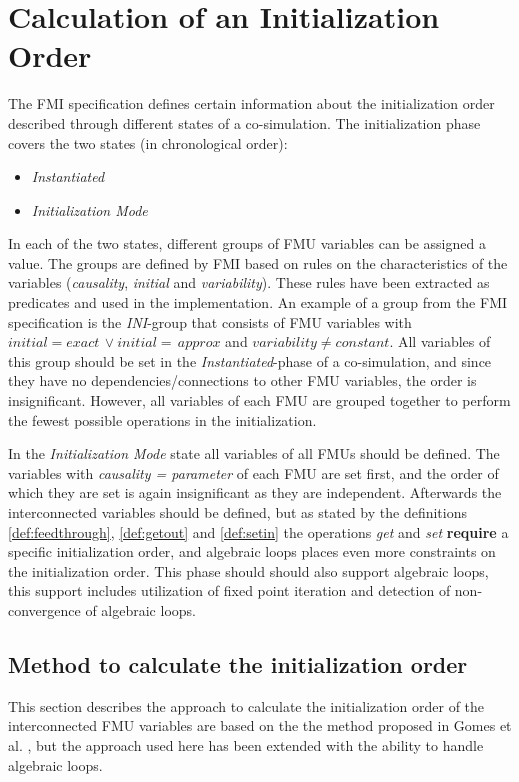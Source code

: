\section{Calculation of an Initialization Order}\label{sc:initilization}
The FMI specification defines certain information about the initialization order described through different states of a co-simulation. The initialization phase covers the two states (in chronological order):
\begin{itemize}
    \item \textit{Instantiated}
    \item \textit{Initialization Mode}
\end{itemize}
In each of the two states, different groups of FMU variables can be assigned a value. The groups are defined by FMI based on rules on the characteristics of the variables (\textit{causality}, \textit{initial} and \textit{variability}). These rules have been extracted as predicates and used in the implementation. 
An example of a group from the FMI specification is the \textit{INI}-group that consists of FMU variables with $initial = exact\, \lor initial = \,approx $  and $variability \neq constant$. All variables of this group should be set in the \textit{Instantiated}-phase of a co-simulation, and since they have no dependencies/connections to other FMU variables, the order is insignificant. However, all variables of each FMU are grouped together to perform the fewest possible operations in the initialization. 

In the \textit{Initialization Mode} state all variables of all FMUs should be defined.
The variables with \textit{causality = parameter} of each FMU are set first, and the order of which they are set is again insignificant as they are independent.
Afterwards the interconnected variables should be defined, but as stated by the definitions \ref{def:feedthrough}, \ref{def:getout} and \ref{def:setin} the operations \textit{get} and \textit{set} \textbf{require} a specific initialization order, and algebraic loops places even more constraints on the initialization order. This phase should should also support algebraic loops, this support includes utilization of fixed point iteration and detection of non-convergence of algebraic loops.

\subsection{Method to calculate the initialization order}
This section describes the approach to calculate the initialization order of the interconnected FMU variables are based on the the method proposed in Gomes et al. \cite{Gomes2019b, BromanCompositionCo-Simulation}, but the approach used here has been extended with the ability to handle algebraic loops. 

